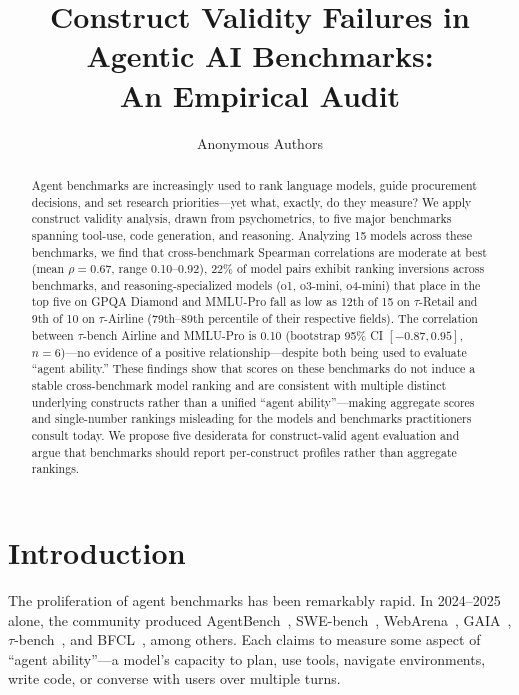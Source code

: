 \documentclass[11pt]{article}
\begin{document}
\title{Construct Validity Failures in Agentic AI Benchmarks:\\An Empirical Audit}

\author{Anonymous Authors}

\maketitle
\begin{abstract}
Agent benchmarks are increasingly used to rank language models, guide procurement decisions, and set research priorities---yet what, exactly, do they measure? We apply construct validity analysis, drawn from psychometrics, to five major benchmarks spanning tool-use, code generation, and reasoning. Analyzing 15 models across these benchmarks, we find that cross-benchmark Spearman correlations are moderate at best (mean $\rho = 0.67$, range 0.10--0.92), 22\% of model pairs exhibit ranking inversions across benchmarks, and reasoning-specialized models (o1, o3-mini, o4-mini) that place in the top five on GPQA Diamond and MMLU-Pro fall as low as 12th of 15 on $\tau$-Retail and 9th of 10 on $\tau$-Airline (79th--89th percentile of their respective fields). The correlation between $\tau$-bench Airline and MMLU-Pro is 0.10 (bootstrap 95\% CI $[-0.87, 0.95]$, $n = 6$)---no evidence of a positive relationship---despite both being used to evaluate ``agent ability.'' These findings show that scores on these benchmarks do not induce a stable cross-benchmark model ranking and are consistent with multiple distinct underlying constructs rather than a unified ``agent ability''---making aggregate scores and single-number rankings misleading for the models and benchmarks practitioners consult today. We propose five desiderata for construct-valid agent evaluation and argue that benchmarks should report per-construct profiles rather than aggregate rankings.
\end{abstract}

\section{Introduction}
The proliferation of agent benchmarks has been remarkably rapid. In 2024--2025 alone, the community produced AgentBench~\cite{liu2024agentbench}, SWE-bench~\cite{jimenez2024swebench}, WebArena~\cite{zhou2024webarena}, GAIA~\cite{mialon2024gaia}, $\tau$-bench~\cite{yao2024taubench}, and BFCL~\cite{patil2025bfcl}, among others. Each claims to measure some aspect of ``agent ability''---a model's capacity to plan, use tools, navigate environments, write code, or converse with users over multiple turns.
\end{document}

